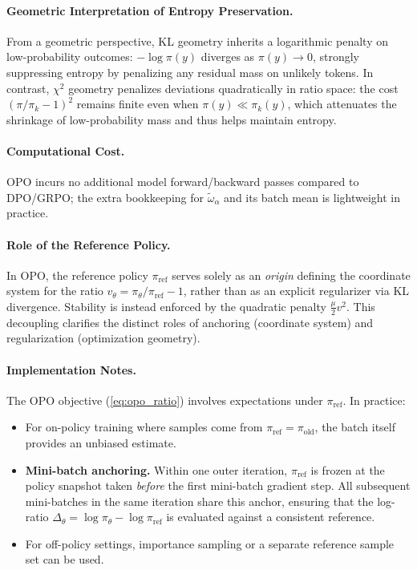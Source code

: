 \documentclass[11pt]{article}
\theoremstyle{definition}
\theoremstyle{remark}
\newcommand{\piref}{\pi_{\mathrm{ref}}}
\newcommand{\pik}{\pi_k}
\begin{document}
\paragraph{Geometric Interpretation of Entropy Preservation.}
From a geometric perspective, KL geometry inherits a logarithmic penalty on low-probability outcomes: $-\log\pi(y)$ diverges as $\pi(y)\to 0$, strongly suppressing entropy by penalizing any residual mass on unlikely tokens. In contrast, $\chi^2$ geometry penalizes deviations quadratically in ratio space: the cost $(\pi/\pik-1)^2$ remains finite even when $\pi(y)\ll \pik(y)$, which attenuates the shrinkage of low-probability mass and thus helps maintain entropy.

\paragraph{Computational Cost.}
OPO incurs no additional model forward/backward passes compared to DPO/GRPO; the extra bookkeeping for $\tilde{\omega}_\alpha$ and its batch mean is lightweight in practice.

\paragraph{Role of the Reference Policy.}
In OPO, the reference policy $\piref$ serves solely as an \emph{origin} defining the coordinate system for the ratio $v_\theta = \pi_\theta/\piref - 1$, rather than as an explicit regularizer via KL divergence. Stability is instead enforced by the quadratic penalty $\frac{\mu}{2} v^2$. This decoupling clarifies the distinct roles of anchoring (coordinate system) and regularization (optimization geometry).

\paragraph{Implementation Notes.}
The OPO objective (\cref{eq:opo_ratio}) involves expectations under $\piref$. In practice:
\begin{itemize}
    \item For on-policy training where samples come from $\piref = \pi_{\text{old}}$, the batch itself provides an unbiased estimate.
    \item \textbf{Mini-batch anchoring.} Within one outer iteration, $\piref$ is frozen at the policy snapshot taken \emph{before} the first mini-batch gradient step. All subsequent mini-batches in the same iteration share this anchor, ensuring that the log-ratio $\Delta_\theta = \log\pi_\theta - \log\piref$ is evaluated against a consistent reference.
    \item For off-policy settings, importance sampling or a separate reference sample set can be used.
\end{itemize}
\end{document}
